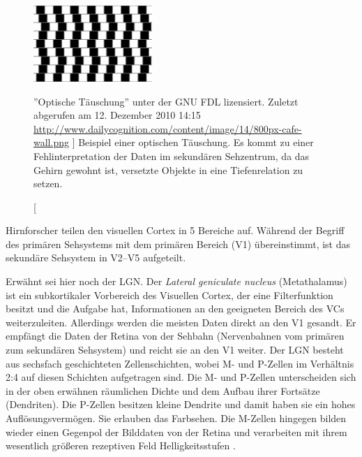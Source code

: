 \documentclass[12pt,a4paper]{article}
\newcommand{\fwex}[1]{\textit{#1}}
\begin{document}
\begin{figure}[p]
  \begin{center}
    \includegraphics[width=0.4\textwidth]{imgs/optical_illusion.png}
    \caption
      [
       ''Optische Täuschung'' unter der GNU FDL lizensiert.
       Zuletzt abgerufen am 12. Dezember 2010 14:15 \hspace{15pt}
       \url{http://www.dailycognition.com/content/image/14/800px-cafe-wall.png}
      ]
      {
       Beispiel einer optischen Täuschung. Es kommt zu einer
       Fehlinterpretation der Daten im sekundären Sehzentrum, da das
       Gehirn gewohnt ist, versetzte Objekte in eine Tiefenrelation
       zu setzen.
      }
    \label{img:illusion}
  \end{center}
\end{figure}

Hirnforscher teilen den visuellen Cortex in 5 Bereiche auf. Während der
Begriff des primären Sehsystems mit dem primären Bereich (V1) übereinstimmt,
ist das sekundäre Sehsystem in V2--V5 aufgeteilt.

Erwähnt sei hier noch der LGN. Der \fwex{Lateral geniculate nucleus}
(Metathalamus) ist ein subkortikaler Vorbereich des Visuellen Cortex,
der eine Filterfunktion besitzt und die Aufgabe hat, Informationen an den
geeigneten Bereich des VCs weiterzuleiten. Allerdings werden die meisten
Daten direkt an den V1 gesandt. Er empfängt die Daten der Retina von der
Sehbahn (Nervenbahnen vom primären zum sekundären Sehsystem) und reicht
sie an den V1 weiter. Der LGN besteht aus sechsfach geschichteten
Zellenschichten, wobei M- und P-Zellen im Verhältnis 2:4 auf diesen
Schichten aufgetragen sind. Die M- und P-Zellen unterscheiden sich in
der oben erwähnen räumlichen Dichte und dem Aufbau ihrer Fortsätze
(Dendriten). Die P-Zellen besitzen kleine Dendrite und damit haben sie
ein hohes Auflösungsvermögen. Sie erlauben das Farbsehen. Die M-Zellen
hingegen bilden wieder einen Gegenpol der Bilddaten von der Retina und
verarbeiten mit ihrem wesentlich größeren rezeptiven Feld Helligkeitsstufen
\cite{vim}.
\end{document}
